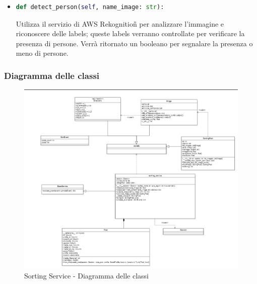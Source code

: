\begin{itemize}
	\item
	\begin{lstlisting}[language=Python, numbers=none]	
def detect_person(self, name_image: str):
	\end{lstlisting}	
Utilizza il servizio di AWS Rekognition\G{} per analizzare l'immagine e riconoscere delle labels; queste labels verranno controllate per verificare la presenza di persone. Verrà ritornato un booleano per segnalare la presenza o meno di persone.
\end{itemize}
\newpage
\subsubsection{Diagramma delle classi}
\begin{figure}[!h]
    \includegraphics[width=15cm]{sezioni/images/cd_sorting.png}
    \caption{Sorting Service - Diagramma delle classi}
\end{figure}
\newpage
